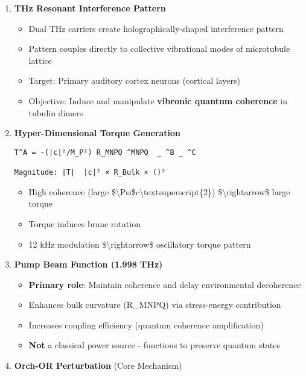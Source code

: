 \begin{enumerate}
\def\labelenumi{\arabic{enumi}.}
\item
  \textbf{THz Resonant Interference Pattern}

  \begin{itemize}
  \tightlist
  \item
    Dual THz carriers create holographically-shaped interference pattern
  \item
    Pattern couples directly to collective vibrational modes of
    microtubule lattice
  \item
    Target: Primary auditory cortex neurons (cortical layers)
  \item
    Objective: Induce and manipulate \textbf{vibronic quantum coherence}
    in tubulin dimers
  \end{itemize}
\item
  \textbf{Hyper-Dimensional Torque Generation}

\begin{verbatim}
T^A = -(|c|²/M_P²) R_MNPQ ^MNPQ  _ ^B _ ^C

Magnitude: |T|  |c|² × R_Bulk × ()²
\end{verbatim}

  \begin{itemize}
  \tightlist
  \item
    High coherence (large
    \textbar\$\textbackslash Psi\$c\textbar\textbackslash textsuperscript\{2\})
    \$\textbackslash rightarrow\$ large torque
  \item
    Torque induces brane rotation
  \item
    12 kHz modulation \$\textbackslash rightarrow\$ oscillatory torque
    pattern
  \end{itemize}
\item
  \textbf{Pump Beam Function (1.998 THz)}

  \begin{itemize}
  \tightlist
  \item
    \textbf{Primary role}: Maintain coherence and delay environmental
    decoherence
  \item
    Enhances bulk curvature (R\_MNPQ) via stress-energy contribution
  \item
    Increases coupling efficiency (quantum coherence amplification)
  \item
    \textbf{Not} a classical power source - functions to preserve
    quantum states
  \end{itemize}
\item
  \textbf{Orch-OR Perturbation} (Core Mechanism)


\end{enumerate}
